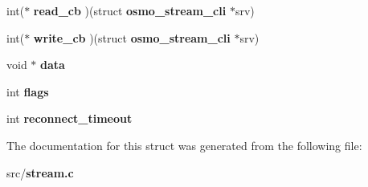 \begin{DoxyCompactItemize}
\item 
int($\ast$ {\bfseries read\+\_\+cb} )(struct {\bf osmo\+\_\+stream\+\_\+cli} $\ast$srv)\label{structosmo__stream__cli_a7fb0e86989dc635fbd48d47518c3772e}

\item 
int($\ast$ {\bfseries write\+\_\+cb} )(struct {\bf osmo\+\_\+stream\+\_\+cli} $\ast$srv)\label{structosmo__stream__cli_a9ada74a5b550df47b11aab680013017f}

\item 
void $\ast$ {\bfseries data}\label{structosmo__stream__cli_a2184b319365317b03c987d5277d23003}

\item 
int {\bfseries flags}\label{structosmo__stream__cli_a671bdf5bb63d5018d9fba64cd46f86c8}

\item 
int {\bfseries reconnect\+\_\+timeout}\label{structosmo__stream__cli_aba8a039b9671714f75f0d25f68be59de}

\end{DoxyCompactItemize}


The documentation for this struct was generated from the following file\+:\begin{DoxyCompactItemize}
\item 
src/{\bf stream.\+c}\end{DoxyCompactItemize}
